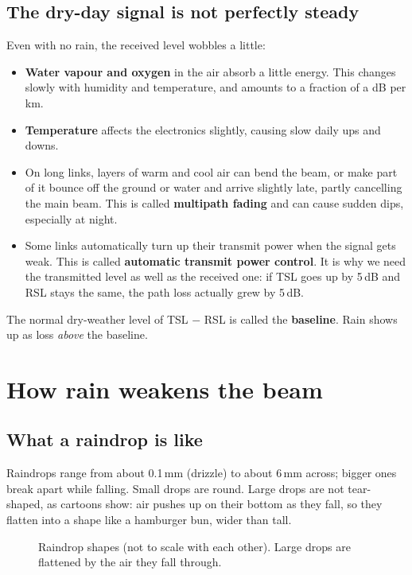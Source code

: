 \documentclass[11pt,a4paper]{article}
\begin{document}
\subsection{The dry-day signal is not perfectly steady}

Even with no rain, the received level wobbles a little:
\begin{itemize}
\item \textbf{Water vapour and oxygen} in the air absorb a little energy. This changes slowly with
humidity and temperature, and amounts to a fraction of a dB per km.
\item \textbf{Temperature} affects the electronics slightly, causing slow daily ups and downs.
\item On long links, layers of warm and cool air can bend the beam, or make part of it bounce off
the ground or water and arrive slightly late, partly cancelling the main beam. This is called
\textbf{multipath fading} and can cause sudden dips, especially at night.
\item Some links automatically turn up their transmit power when the signal gets weak. This is called
\textbf{automatic transmit power control}. It is why we need the transmitted level as well as the received one: if
TSL goes up by 5\,dB and RSL stays the same, the path loss actually grew by 5\,dB.
\end{itemize}
The normal dry-weather level of TSL $-$ RSL is called the \textbf{baseline}. Rain shows up as loss
\emph{above} the baseline.

\section{How rain weakens the beam}
\label{sec:rain}

\subsection{What a raindrop is like}

Raindrops range from about 0.1\,mm (drizzle) to about 6\,mm across; bigger ones break apart while falling.
Small drops are round. Large drops are not tear-shaped, as cartoons show: air pushes up on their
bottom as they fall, so they flatten into a shape like a hamburger bun, wider than tall.

\begin{figure}[h]
\centering
{}
\caption{Raindrop shapes (not to scale with each other). Large drops are flattened by the air they fall through.}
\end{figure}
\end{document}
